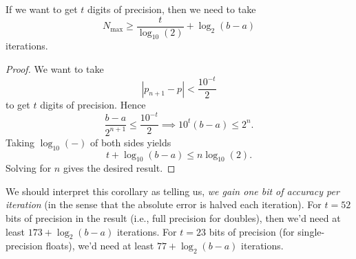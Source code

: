 \begin{cor}
  If we want to get $t$ digits of precision, then we need to take
  \begin{equation*}
    N_{\text{max}}\geq \frac{t}{\log_{10}(2)} + \log_{2}(b-a)
  \end{equation*}
  iterations.
\end{cor}
\begin{proof}
  We want to take
  \begin{equation}
    |p_{n+1} - p| < \frac{10^{-t}}{2}
  \end{equation}
  to get $t$ digits of precision. Hence
  \begin{equation}
    \frac{b-a}{2^{n+1}}\leq\frac{10^{-t}}{2}\implies 10^{t}(b-a)\leq 2^{n}.
  \end{equation}
  Taking $\log_{10}(-)$ of both sides yields
  \begin{equation}
    t + \log_{10}(b-a)\leq n \log_{10}(2).
  \end{equation}
  Solving for $n$ gives the desired result.
\end{proof}

\begin{rmk}
  We should interpret this corollary as telling us, \emph{we gain one
  bit of accuracy per iteration} (in the sense that the absolute error
  is halved each iteration).
  For $t=52$ bits of precision in the result (i.e., full precision for
  doubles), then we'd need at least $173 + \log_{2}(b-a)$ iterations.
  For $t=23$ bits of precision (for single-precision floats), we'd need
  at least $77 + \log_{2}(b-a)$ iterations.
\end{rmk}


